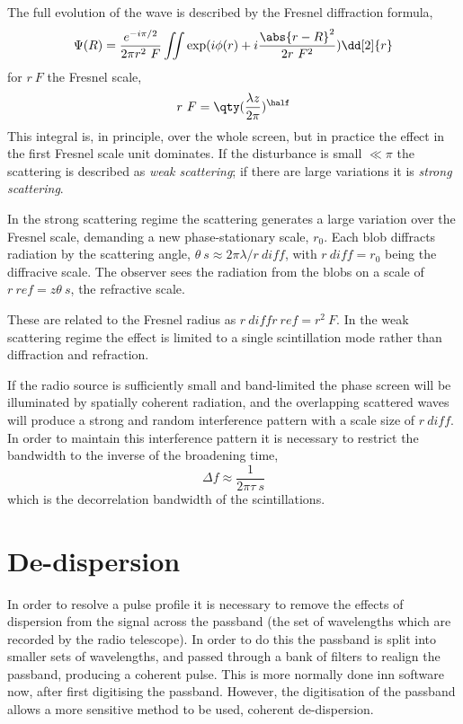 The full evolution of the wave is described by the Fresnel diffraction
formula,
\begin{equation}
  \label{eq:113}
  \Psi(R) = \frac{e^{-i \pi/2}}{ 2 \pi r^2~F} \iint \exp( i \phi(r) + i \frac{\abs{r-R}^2}{2 r~F^2} ) \dd[2]{r} 
\end{equation}
for $r~F$ the Fresnel scale,
\[ r~F = \qty( \frac{\lambda z}{2 \pi} )^{\half} \] This integral is,
in principle, over the whole screen, but in practice the effect in the
first Fresnel scale unit dominates. If the disturbance is small $\ll
\pi$ the scattering is described as \emph{weak scattering}; if there
are large variations it is \emph{strong scattering}.

In the strong scattering regime the scattering generates a large
variation over the Fresnel scale, demanding a new phase-stationary
scale, $r_0$. Each blob diffracts radiation by the scattering angle,
$\theta~s \approx 2 \pi \lambda / r~{diff}$, with $r~{diff} = r_0$
being the diffracive scale. The observer sees the radiation from the
blobs on a scale of $r~{ref}= z\theta~s$, the refractive scale.

These are related to the Fresnel radius as $r~{diff} r~{ref} =
r^2~F$. In the weak scattering regime the effect is limited to a
single scintillation mode rather than diffraction and refraction.

If the radio source is sufficiently small and band-limited the phase
screen will be illuminated by spatially coherent radiation, and the
overlapping scattered waves will produce a strong and random
interference pattern with a scale size of $r~{diff}$. In order to
maintain this interference pattern it is necessary to restrict the
bandwidth to the inverse of the broadening time,
\[ \Delta f \approx \frac{1}{2 \pi \tau~s} \] which is the
decorrelation bandwidth of the scintillations.

\section{De-dispersion}
\label{sec:de-dispersion}

In order to resolve a pulse profile it is necessary to remove the
effects of dispersion from the signal across the passband (the set of
wavelengths which are recorded by the radio telescope). In order to do
this the passband is split into smaller sets of wavelengths, and
passed through a bank of filters to realign the passband, producing a
coherent pulse. This is more normally done inn software now, after
first digitising the passband. However, the digitisation of the
passband allows a more sensitive method to be used, coherent
de-dispersion.




